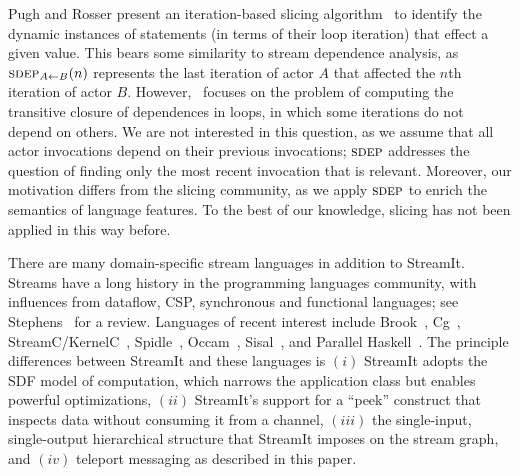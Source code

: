 Pugh and Rosser present an iteration-based slicing
algorithm~\cite{pugh97slice} to identify the dynamic instances of
statements (in terms of their loop iteration) that effect a given
value.  This bears some similarity to stream dependence analysis, as
$\sdepf{A}{B}(n)$ represents the last iteration of actor $A$ that
affected the $n$th iteration of actor $B$.
However,~\cite{pugh97slice} focuses on the problem of computing the
transitive closure of dependences in loops, in which some iterations
do not depend on others.  We are not interested in this question, as
we assume that all actor invocations depend on their previous
invocations; $\textsc{sdep}$ addresses the question of finding only the most
recent invocation that is relevant.  Moreover, our motivation differs
from the slicing community, as we apply $\textsc{sdep}$ to enrich the
semantics of language features.  To the best of our knowledge, slicing
has not been applied in this way before.

There are many domain-specific stream languages in addition to
StreamIt.  Streams have a long history in the programming languages
community, with influences from dataflow, CSP, synchronous and
functional languages; see Stephens~\cite{survey97} for a review.
Languages of recent interest include Brook~\cite{brook04},
Cg~\cite{cg03}, StreamC/KernelC~\cite{imagine03ieee},
Spidle~\cite{spidle02}, Occam~\cite{occammanual}, Sisal~\cite{sisal},
and Parallel Haskell~\cite{ph}.  The principle differences between
StreamIt and these languages is $(i)$ StreamIt adopts the SDF model of
computation, which narrows the application class but enables powerful
optimizations, $(ii)$ StreamIt's support for a ``peek'' construct that
inspects data without consuming it from a channel, $(iii)$ the
single-input, single-output hierarchical structure that StreamIt
imposes on the stream graph, and $(iv)$ teleport messaging as
described in this paper.
